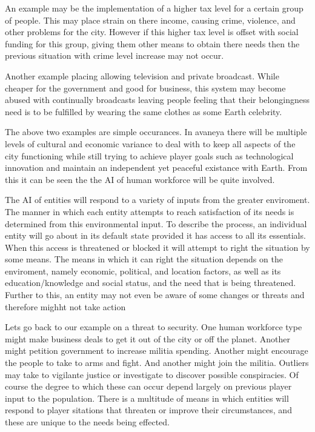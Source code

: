 An example may be the implementation of a higher tax level for a certain group of people. This may place strain on there income, causing crime, violence, and other problems for the city. However if this higher tax level is offset with social funding for this group, giving them other means to obtain there needs then the previous situation with crime level increase may not occur. 

Another example placing allowing television and private broadcast. While cheaper for the government and good for business, this system may become abused with continually broadcasts leaving people feeling that their belongingness need is to be fulfilled by wearing the same clothes as some Earth celebrity. 

The above two examples are simple occurances. In avaneya there will be multiple levels of cultural and economic variance to deal with to keep all aspects of the city functioning while still trying to achieve player goals such as technological innovation and maintain an independent yet peaceful existance with Earth. From this it can be seen the the AI of human workforce will be quite involved.   

 

The AI of entities will respond to a variety of inputs from the greater enviroment. The manner in which each entity attempts to reach satisfaction of its needs is determined from this environmental input. To describe the process, an individual entity will go about in its default state provided it has access to all its essentials. When this access is threatened or blocked it will attempt to right the situation by some means. The means in which it can right the situation depends on the enviroment, namely economic, political, and location factors, as well as its education/knowledge and social status, and the need that is being threatened. Further to this, an entity may not even be aware of some changes or threats and therefore mighht not take action

Lets go back to our example on a threat to security. One human workforce type might make business deals to get it out of the city or off the planet. Another might petition government to increase militia spending. Another might encourage the people to take to arms and fight. And another might join the militia. Outliers may take to vigilante justice or investigate to discover possible conspiracies. Of course the degree to which these can occur depend largely on previous player input to the population. There is a multitude of means in which entities will respond to player sitations that threaten or improve their circumstances, and these are unique to the needs being effected.

